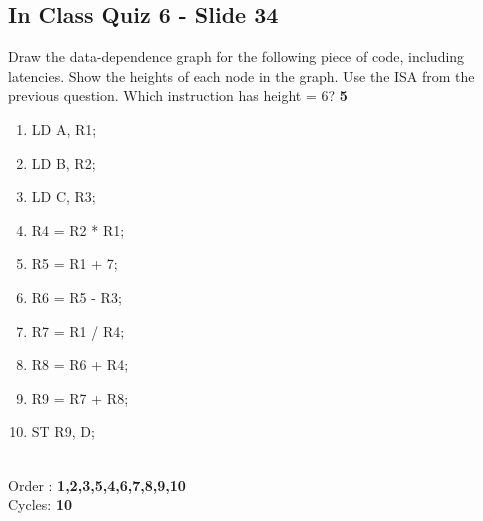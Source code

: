 \documentclass{report}
\begin{document}
\subsection{In Class Quiz 6 - Slide 34}
Draw the data-dependence graph for the following piece of code, including latencies. Show the heights of each node in the graph. Use the ISA from the previous question. Which instruction has height = 6? \textbf{5}
\begin{multicols}{2}
\begin{enumerate}
  \item LD A, R1;
  \item LD B, R2;
  \item LD C, R3;
  \item R4 = R2 * R1;
  \item R5 = R1 + 7;
  \item R6 = R5 - R3;
  \item R7 = R1 / R4;
  \item R8 = R6 + R4;
  \item R9 = R7 + R8;
  \item ST R9, D;
\end{enumerate} \ \\
Order : \textbf{1,2,3,5,4,6,7,8,9,10} \\ 
Cycles: \textbf{10} \\ \ \\ \ \\


\end{multicols}
\end{document}
